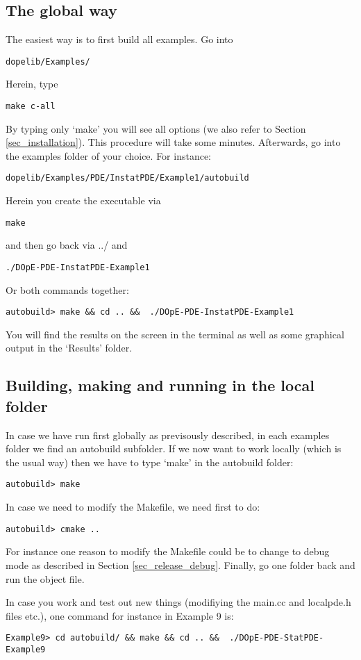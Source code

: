 \subsection{The global way}
The easiest way is to first build all examples. Go into 
\begin{lstlisting}
dopelib/Examples/
\end{lstlisting}
Herein, type 
\begin{lstlisting}
make c-all
\end{lstlisting}
By typing only `make' you will see all options 
(we also refer to Section \ref{sec_installation}).
This procedure will take some minutes. Afterwards,
go into the examples folder of your choice. For instance:
\begin{lstlisting}
dopelib/Examples/PDE/InstatPDE/Example1/autobuild
\end{lstlisting}
Herein you create the executable via
\begin{lstlisting}
make 
\end{lstlisting}
and then go back via ../ and 
\begin{lstlisting}
./DOpE-PDE-InstatPDE-Example1 
\end{lstlisting}
Or both commands together:
\begin{lstlisting}
autobuild> make && cd .. &&  ./DOpE-PDE-InstatPDE-Example1 
\end{lstlisting}
You will find the results on the screen in the terminal as well
as some graphical output in the `Results' folder.

\subsection{Building, making and running in the local folder}
In case we have run first globally as previsously described, 
in each examples folder we find an autobuild subfolder. 
If we now want to work locally (which is the usual way) then 
we have to type `make' in the autobuild folder:
\begin{lstlisting}
autobuild> make
\end{lstlisting}
In case we need to modify the Makefile, we need first to do:
\begin{lstlisting}
autobuild> cmake ..
\end{lstlisting}
For instance one reason to modify the Makefile could be 
to change to debug mode as described in Section \ref{sec_release_debug}.
Finally, go one folder back and run the object file.

In case you work and test out new things (modifiying the 
main.cc and localpde.h files etc.), one command for instance 
in Example 9 is:
\begin{lstlisting}
Example9> cd autobuild/ && make && cd .. &&  ./DOpE-PDE-StatPDE-Example9
\end{lstlisting}





